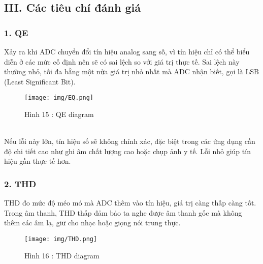 \documentclass[a4paper,13pt]{article}
\begin{document}
\clearpage
\subsection{III. Các tiêu chí đánh giá}
\subsubsection*{1. QE}
Xảy ra khi ADC chuyển đổi tín hiệu analog sang số, vì tín hiệu chỉ có thể biểu diễn ở các mức cố định nên sẽ có sai lệch so với giá trị thực tế. Sai lệch này thường nhỏ, tối đa bằng một nửa giá trị nhỏ nhất mà ADC nhận biết, gọi là LSB (Least Significant Bit).
\begin{figure}[htbp]
    \centering
    \texttt{[image: img/EQ.png]}
    \caption*{Hình 15 : QE diagram \cite{key3} }
    \label{fig:model}
\end{figure}\\
Nếu lỗi này lớn, tín hiệu số sẽ không chính xác, đặc biệt trong các ứng dụng cần độ chi tiết cao như ghi âm chất lượng cao hoặc chụp ảnh y tế. Lỗi nhỏ giúp tín hiệu gần thực tế hơn.

\subsubsection*{2. THD}
THD đo mức độ méo mó mà ADC thêm vào tín hiệu, giá trị càng thấp càng tốt. Trong âm thanh, THD thấp đảm bảo ta nghe được âm thanh gốc mà không thêm các âm lạ, giữ cho nhạc hoặc giọng nói trung thực.

\begin{figure}[htbp]
    \centering
    \texttt{[image: img/THD.png]}
    \caption*{Hình 16 : THD diagram \cite{key3} }
    \label{fig:model}
\end{figure}


\clearpage
\end{document}
